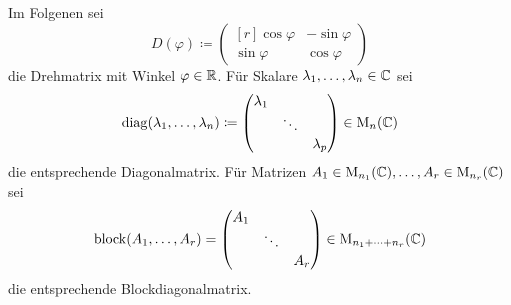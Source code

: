 \documentclass[a4paper, 10pt, numbers=noenddot]{scrartcl}
\begin{document}
Im Folgenen sei
\[
  D(\varphi)
  \coloneqq
  \begin{pmatrix*}[r]
    \cos \varphi  & -\sin \varphi \\
    \sin \varphi  &  \cos \varphi
  \end{pmatrix*}
\]
die Drehmatrix mit Winkel $\varphi \in \mathbb{R}$.
Für Skalare $\lambda_1, \dotsc, \lambda_n \in \mathbb{C}$ sei
\[
  \operatorname{\operatorname{diag}}(\lambda_1, \dotsc, \lambda_n)
  \coloneqq
  \begin{pmatrix}
    \lambda_1 &         &           \\
              & \ddots  &           \\
              &         & \lambda_p
  \end{pmatrix}
  \in
  \operatorname{M}_n(\mathbb{C})
\]
die entsprechende Diagonalmatrix.
Für Matrizen $A_1 \in \operatorname{M}_{n_1}(\mathbb{C}), \dotsc, A_r \in \operatorname{M}_{n_r}(\mathbb{C})$ sei
\[
  \operatorname{\operatorname{block}}(A_1, \dotsc, A_r)
  =
  \begin{pmatrix}
    A_1 &         &     \\
        & \ddots  &     \\
        &         & A_r
  \end{pmatrix}
  \in
  \operatorname{M}_{n_1 + \dotsb + n_r}(\mathbb{C})
\]
die entsprechende Blockdiagonalmatrix.
\end{document}
